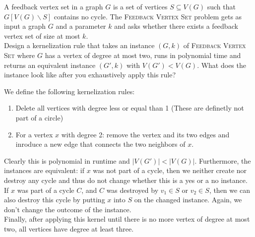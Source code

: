 \documentclass{article}
\begin{document}
\begin{exercise}\label{ex:7}
    A feedback vertex set in a graph $G$ is a set of vertices $S\subseteq V(G)$ such that $G[V(G)\backslash S]$ contains no cycle. The \textsc{Feedback Vertex Set} problem gets as input a graph $G$ and a parameter $k$ and asks whether there exists a feedback vertex set of size at most $k$. \\
    Design a kernelization rule that takes an instance $(G,k)$ of \textsc{Feedback Vertex Set} where $G$ has a vertex of degree at most two, runs in polynomial time and returns an equivalent instance $(G', k)$ with $V(G') < V(G)$. What does the instance look like after you exhaustively apply this rule?
\end{exercise}
\begin{solving}
    We define the following kernelization rules:
    \begin{enumerate}
        \item Delete all vertices with degree less or equal than 1 (These are definetly not part of a circle)
        \item For a vertex $x$ with degree 2: remove the vertex and its two edges and inroduce a new edge that connects the two neighbors of $x$.
    \end{enumerate}
    Clearly this is polynomial in runtime and $|V(G')|< |V(G)|$. Furthermore, the instances are equivalent: if $x$ was not part of a cycle, then we neither create nor destroy any cycle and thus do not change whether this is a yes or a no instance. If $x$ was part of a cycle $C$, and $C$ was destroyed by $v_1\in S$ or $v_2\in S$, then  we can also destroy this cycle by putting $x$ into $S$ on the changed instance. Again, we don't change the outcome of the instance.\\
    Finally, after applying this kernel until there is no more vertex of degree at most two, all vertices have degree at least three.
\end{solving}
\end{document}
